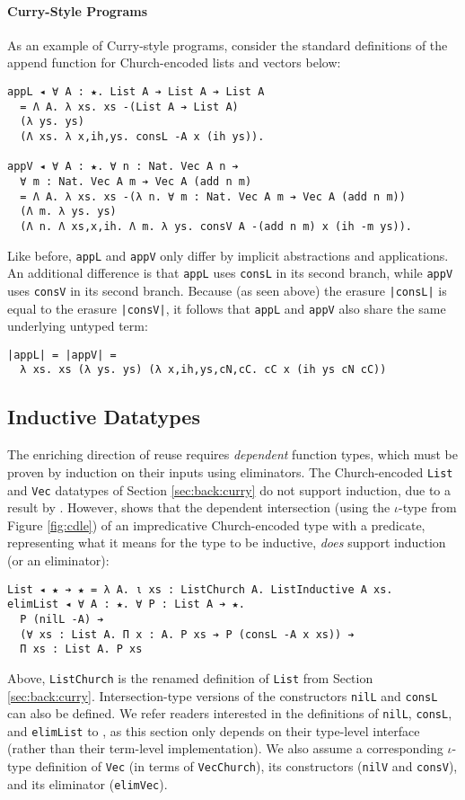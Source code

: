 \documentclass[acmsmall]{acmart}\settopmatter{}
\newcommand{\refsec}[1]{Section \ref{sec:#1}}
\newcommand{\labsec}[1]{\label{sec:#1}}
\newcommand{\reffig}[1]{Figure \ref{fig:#1}}
\begin{document}

\paragraph{Curry-Style Programs}
As an example of Curry-style programs, consider the standard
definitions of the append function for Church-encoded lists and
vectors below:
\begin{verbatim}
appL ◂ ∀ A : ★. List A ➔ List A ➔ List A
  = Λ A. λ xs. xs -(List A ➔ List A)
  (λ ys. ys)
  (Λ xs. λ x,ih,ys. consL -A x (ih ys)).

appV ◂ ∀ A : ★. ∀ n : Nat. Vec A n ➔ 
  ∀ m : Nat. Vec A m ➔ Vec A (add n m)
  = Λ A. λ xs. xs -(λ n. ∀ m : Nat. Vec A m ➔ Vec A (add n m))
  (Λ m. λ ys. ys)
  (Λ n. Λ xs,x,ih. Λ m. λ ys. consV A -(add n m) x (ih -m ys)).
\end{verbatim}
Like before, \verb;appL; and \verb;appV; only differ by implicit
abstractions and applications. An additional difference is that
\verb;appL; uses \verb;consL; in its second branch, while \verb;appV; uses
\verb;consV; in its second branch. Because (as seen above)
the erasure \verb;|consL|; is equal to the erasure \verb;|consV|;, it
follows that \verb;appL; and \verb;appV; also share the same
underlying untyped term:
\begin{verbatim}
|appL| = |appV| = 
  λ xs. xs (λ ys. ys) (λ x,ih,ys,cN,cC. cC x (ih ys cN cC))
\end{verbatim}

\subsection{Inductive Datatypes}
\labsec{back:inductive}

The enriching direction of reuse requires \textit{dependent}
function types, which must be proven by induction on their inputs using
eliminators. The Church-encoded \verb;List; and \verb;Vec; datatypes
of \refsec{back:curry} do not support induction, due to a result by
\citet{geuvers01}. However, \citet{stump18} shows that the
dependent intersection (using the $\iota$-type from \reffig{cdle})
of an impredicative Church-encoded type with a
predicate, representing what it means for the type to be inductive,
\textit{does} support induction (or an eliminator):
\begin{verbatim}
List ◂ ★ ➔ ★ = λ A. ι xs : ListChurch A. ListInductive A xs.
elimList ◂ ∀ A : ★. ∀ P : List A ➔ ★.
  P (nilL -A) ➔
  (∀ xs : List A. Π x : A. P xs ➔ P (consL -A x xs)) ➔
  Π xs : List A. P xs
\end{verbatim}
Above, \verb;ListChurch; is the renamed definition of \verb;List; from
\refsec{back:curry}. Intersection-type versions of the constructors
\verb;nilL; and \verb;consL; can also be defined. We refer readers interested
in the definitions of \verb;nilL;, \verb;consL;, and \verb;elimList;
to \citet{stump18}, as this section only depends on their
type-level interface (rather than their term-level implementation). We
also assume a corresponding $\iota$-type definition of \verb;Vec;
(in terms of \verb;VecChurch;), its constructors (\verb;nilV; and
\verb;consV;), and its eliminator (\verb;elimVec;).
\end{document}
